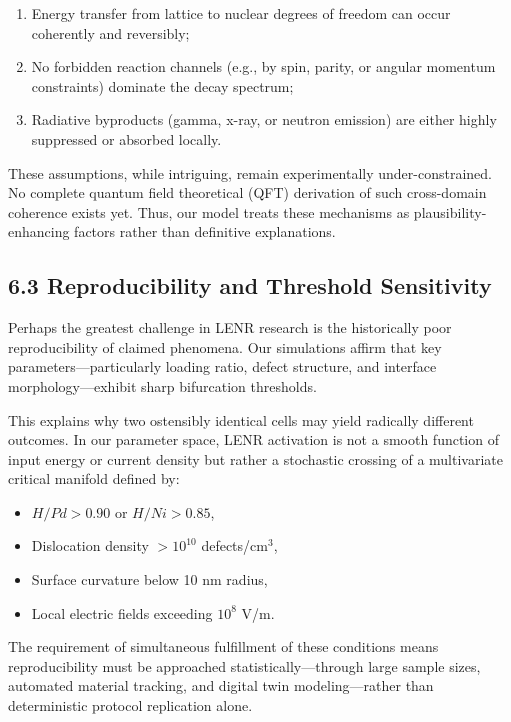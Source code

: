     \begin{enumerate}
        \item Energy transfer from lattice to nuclear degrees of freedom can occur coherently and reversibly;
        \item No forbidden reaction channels (e.g., by spin, parity, or angular momentum constraints) dominate the decay spectrum;
        \item Radiative byproducts (gamma, x-ray, or neutron emission) are either highly suppressed or absorbed locally.
    \end{enumerate}
    
    These assumptions, while intriguing, remain experimentally under-constrained. No complete quantum field theoretical (QFT) derivation of such cross-domain coherence exists yet. Thus, our model treats these mechanisms as plausibility-enhancing factors rather than definitive explanations.
    
    \subsection{6.3 Reproducibility and Threshold Sensitivity}
    
    Perhaps the greatest challenge in LENR research is the historically poor reproducibility of claimed phenomena. Our simulations affirm that key parameters—particularly loading ratio, defect structure, and interface morphology—exhibit sharp bifurcation thresholds.
    
    This explains why two ostensibly identical cells may yield radically different outcomes. In our parameter space, LENR activation is not a smooth function of input energy or current density but rather a stochastic crossing of a multivariate critical manifold defined by:
    
    \begin{itemize}
        \item $H/Pd > 0.90$ or $H/Ni > 0.85$,
        \item Dislocation density $>10^{10}$ defects/cm$^3$,
        \item Surface curvature below 10 nm radius,
        \item Local electric fields exceeding $10^8$ V/m.
    \end{itemize}
    
    The requirement of simultaneous fulfillment of these conditions means reproducibility must be approached statistically—through large sample sizes, automated material tracking, and digital twin modeling—rather than deterministic protocol replication alone.
    
